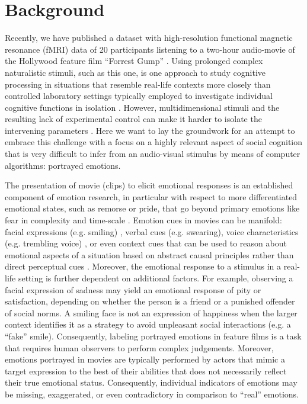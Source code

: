 \section*{Background} 


Recently, we have published a dataset with high-resolution functional magnetic
resonance (fMRI) data of 20 participants listening to a two-hour audio-movie of
the Hollywood feature film ``Forrest Gump'' \cite{HBI+14}. Using prolonged
complex naturalistic stimuli, such as this one, is one approach to study
cognitive processing in situations that resemble real-life contexts more
closely than controlled laboratory settings typically employed to investigate
individual cognitive functions in isolation \cite{HH2012}. However,
multidimensional stimuli and the resulting lack of experimental control can
make it harder to isolate the intervening parameters \cite{HH2012}. Here we
want to lay the groundwork for an attempt to embrace this challenge with a
focus on a highly relevant aspect of social cognition that is
very difficult to infer from an audio-visual stimulus by means of computer
algorithms: portrayed emotions.

The presentation of movie (clips) to elicit emotional responses is an
established component of emotion research, in particular with respect to more
differentiated emotional states, such as remorse or pride, that go beyond
primary emotions like fear in complexity and time-scale \cite{GL1995}. Emotion
cues in movies can be manifold: facial expressions (e.g.
smiling) \cite{Ekm1992b}, verbal cues (e.g. swearing), voice characteristics
(e.g. trembling voice) \cite{EVS+2009}, or even context cues that can be used to
reason about emotional aspects of a situation based on abstract causal
principles rather than direct perceptual cues \cite{SS2014}.  Moreover, the
emotional response to a stimulus in a real-life setting is further dependent on
additional factors. For example, observing a facial expression of sadness may
yield an emotional response of pity or satisfaction, depending on whether the
person is a friend or a punished offender of social norms. A smiling face is
not an expression of happiness when the larger context identifies it as a
strategy to avoid unpleasant social interactions (e.g. a ``fake'' smile).
Consequently, labeling portrayed emotions in feature films is a task that
requires human observers to perform complex judgements. Moreover, emotions portrayed in
movies are typically performed by actors that mimic a target expression to the
best of their abilities that does not necessarily reflect their true emotional
status.  Consequently, individual indicators of emotions may be missing,
exaggerated, or even contradictory in comparison to ``real'' emotions.

